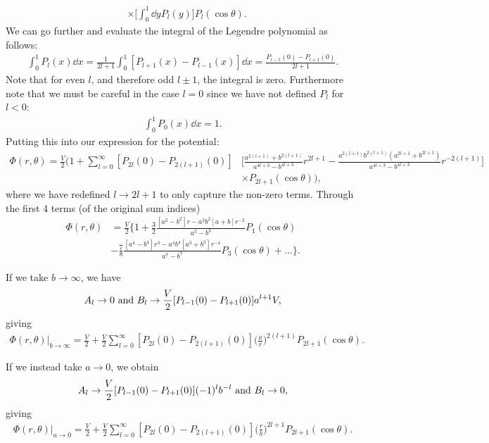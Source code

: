 {\begin{align}
    &\times \Big[ \int_{0}^{1} \dd{y} P_{l}(y) \Big] P_{l}(\cos{\theta})
.\end{align}
We can go further and evaluate the integral of the Legendre polynomial as follows:
\begin{align}
    \int_{0}^{1} P_{l}(x) \dd{x} = \frac{1}{2l+1} \int_{0}^{1} [ P_{l+1}(x) - P_{l-1}(x) ] \dd{x} = \frac{P_{l-1}(0) - P_{l+1}(0)}{2l+1}
.\end{align}
Note that for even $l$, and therefore odd $l \pm 1$, the integral is zero.
Furthermore note that we must be careful in the case $l=0$ since we have not defined $P_{l}$ for $l < 0$:
\begin{align}
    \int_{0}^{1} P_{0}(x) \dd{x} = 1
.\end{align}
Putting this into our expression for the potential:
\begin{align}
    \Phi(r,\theta) = \frac{V}{2} \Bigg( 1 + \sum_{l=0}^{\infty} [P_{2l}(0) - P_{2(l+1)}(0)] &\Bigg[ \frac{a^{2(l+1)} + b^{2(l+1)}}{a^{4l+3} - b^{4l+3}} r^{2l+1} - \frac{a^{2(l+1)}b^{2(l+1)}(a^{2l+1} + b^{2l+1})}{a^{4l+3} - b^{4l+3}} r^{-2(l+1)} \Bigg] \nonumber \\
    &\times P_{2l+1}(\cos{\theta})  \Bigg)
,\end{align}
where we have redefined $l \rightarrow 2l+1$ to only capture the non-zero terms.
Through the first 4 terms (of the original sum indices)
\begin{align}
    \Phi(r,\theta) &= \frac{V}{2} \Bigg\{ 1 + \frac{3}{2} \frac{[a^{2} - b^{2}] r - a^{2}b^{2}[a + b] r^{-2}}{a^{3} - b^{3}} P_{1}(\cos{\theta}) \nonumber \\
    &- \frac{7}{8} \frac{[a^{4} - b^{4}] r^{3} - a^{4}b^{4}[a^{3} + b^{3}] r^{-4}}{a^{7} - b^{7}} P_{3}(\cos{\theta}) + \ldots \Bigg\}
.\end{align}

If we take $b \rightarrow \infty$, we have
\begin{align}
    A_{l} \rightarrow 0 ~{\rm and}~ B_{l} \rightarrow \frac{V}{2} [P_{l-1}(0) - P_{l+1}(0)] a^{l+1} V
,\end{align}
giving
\begin{align}
    \Phi(r,\theta)\Big|_{b \rightarrow \infty} = \frac{V}{2} + \frac{V}{2} \sum_{l=0}^{\infty} [ P_{2l}(0) - P_{2(l+1)}(0) ] \Big( \frac{a}{r} \Big)^{2(l+1)} P_{2l+1}(\cos{\theta})
.\end{align}

If we instead take $a \rightarrow 0$, we obtain
\begin{align}
    A_{l} \rightarrow \frac{V}{2} [P_{l-1}(0) - P_{l+1}(0)] (-1)^{l} b^{-l} ~{\rm and}~ B_{l} \rightarrow 0
,\end{align}
giving
\begin{align}
    \Phi(r,\theta)\Big|_{a \rightarrow 0} = \frac{V}{2} + \frac{V}{2} \sum_{l=0}^{\infty} [P_{2l}(0) - P_{2(l+1)}(0)] \Big( \frac{r}{b} \Big)^{2l+1} P_{2l+1}(\cos{\theta})
.\end{align}


}



